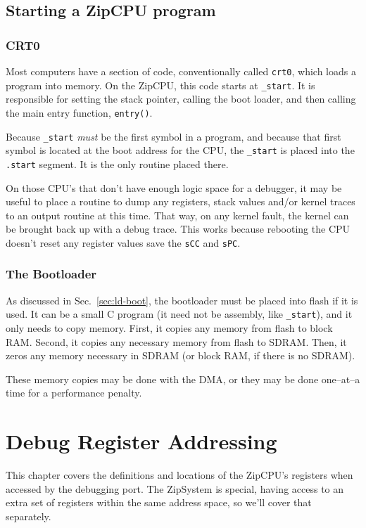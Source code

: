 \documentclass{gqtekspec}
\begin{document}
\section{Starting a ZipCPU program}
\subsection{CRT0}

Most computers have a section of code, conventionally called {\tt crt0}, which
loads a program into memory.  On the ZipCPU, this code starts at {\tt \_start}.
It is responsible for setting the stack pointer, calling the boot loader,
and then calling the main entry function, {\tt entry()}.

Because {\tt \_start} {\em must} be the first symbol in a program, and because
that first symbol is located at the boot address for the CPU, the {\tt \_start}
is placed into the {\tt .start} segment.  It is the only routine placed there.

On those CPU's that don't have enough logic space for a debugger, it may be
useful to place a routine to dump any registers, stack values and/or kernel
traces to an output routine at this time.  That way, on any kernel fault, the
kernel can be brought back up with a debug trace.  This works because rebooting
the CPU doesn't reset any register values save the {\tt sCC} and {\tt sPC}.

\subsection{The Bootloader}

As discussed in Sec.~\ref{sec:ld-boot}, the bootloader must be placed into 
flash if it is used.  It can be a small C program (it need not be assembly,
like {\tt \_start}), and it only needs to copy memory.  First, it copies any
memory from flash to block RAM.  Second, it copies any necessary memory from
flash to SDRAM.  Then, it zeros any memory necessary in SDRAM (or block RAM,
if there is no SDRAM).

These memory copies may be done with the DMA, or they may be done one--at--a
time for a performance penalty.

\chapter{Debug Register Addressing}\label{chap:regs}
This chapter covers the definitions and locations of the ZipCPU's registers
when accessed by the debugging port.  The ZipSystem is special, having access
to an extra set of registers within the same address space, so we'll cover
that separately.
\end{document}
